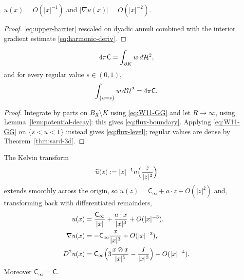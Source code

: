 \begin{lemma}[Decay]\label{lem:potential-decay}
$u(x)=O(|x|^{-1})$ and $|\nabla u(x)|=O(|x|^{-2})$.
\end{lemma}

\begin{proof}
\eqref{eq:upper-barrier} rescaled on dyadic annuli combined with the interior
gradient estimate \eqref{eq:harmonic-deriv}.
\end{proof}

\begin{lemma}\label{lem:flux-identity}
\begin{equation}\label{eq:flux-boundary}
  4\pi\mathsf C=\int_{\partial K}w\,d\mathcal H^2 ,
\end{equation}
and for every regular value $s\in(0,1)$,
\begin{equation}\label{eq:flux-level}
  \int_{\{u=s\}}w\,d\mathcal H^2=4\pi\mathsf C .
\end{equation}
\end{lemma}

\begin{proof}
Integrate by parts on $B_R\setminus K$ using \eqref{eq:W11-GG} and let
$R\to\infty$, using Lemma~\ref{lem:potential-decay}: this gives
\eqref{eq:flux-boundary}.  Applying \eqref{eq:W11-GG} on
$\{s<u<1\}$ instead gives \eqref{eq:flux-level}; regular values are dense by
Theorem~\ref{thm:sard-3d}.
\end{proof}

\begin{lemma}\label{lem:kelvin}
The Kelvin transform
\begin{equation}\label{eq:kelvin}
  \widetilde u(z):=|z|^{-1}u\Bigl(\frac z{|z|^2}\Bigr)
\end{equation}
extends smoothly across the origin, so
$\widetilde u(z)=\mathsf C_\infty+a\cdot z+O(|z|^2)$ and, transforming back
with differentiated remainders,
\begin{align}
  u(x)&=\frac{\mathsf C_\infty}{|x|}+\frac{a\cdot x}{|x|^3}+O(|x|^{-3}),
    \label{eq:u-expansion}\\
  \nabla u(x)&=-\mathsf C_\infty\frac{x}{|x|^3}+O(|x|^{-3}),
    \label{eq:grad-u-expansion}\\
  D^2u(x)&=\mathsf C_\infty\Bigl(3\frac{x\otimes x}{|x|^5}-\frac{I}{|x|^3}\Bigr)
    +O(|x|^{-4}).
    \label{eq:hess-u-expansion}
\end{align}
Moreover $\mathsf C_\infty=\mathsf C$.
\end{lemma}

